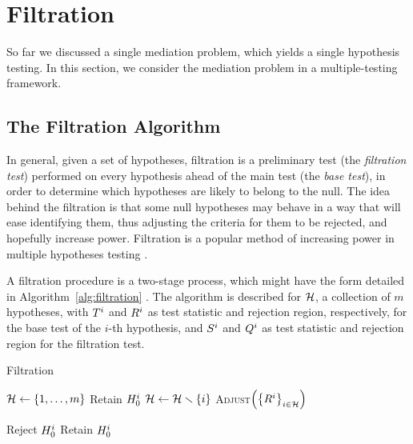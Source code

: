 \documentclass[ejs, twoside]{imsart}
\theoremstyle{plain}
\theoremstyle{remark}
\numberwithin{equation}{section}
\numberwithin{table}{section}
\numberwithin{figure}{section}
\let\originalleft\left
\let\originalright\right
\renewcommand{\left}{\mathopen{}\mathclose\bgroup\originalleft}
\renewcommand{\right}{\aftergroup\egroup\originalright}
\begin{document}
\section{Filtration} \label{sec:filt}
So far we discussed a single mediation problem, which yields a single hypothesis testing. In this section, we consider the mediation problem in a multiple-testing framework.

\subsection{The Filtration Algorithm} \label{sec:filt-alg}

In general, given a set of hypotheses, filtration is a preliminary test (the \emph{filtration test}) performed on every hypothesis ahead of the main test (the \emph{base test}), in order to determine which hypotheses are likely to belong to the null. The idea behind the filtration is that some null hypotheses may behave in a way that will ease identifying them, thus adjusting the criteria for them to be rejected, and hopefully increase power. Filtration is a popular method of increasing power in multiple hypotheses testing \citep{mcclintick_effects_2006, talloen_ini-calls_2007, hackstadt_filtering_2009}.

A filtration procedure is a two-stage process, which might have the form detailed in Algorithm~\ref{alg:filtration} \citep{bourgon_independent_2010, ignatiadis_data-driven_2016}. The algorithm is described for \(\mathcal{H}\), a collection of \(m\) hypotheses, with \(\basestat[i]\) and \(\baserr[i]\) as test statistic and rejection region, respectively, for the base test of the \(i\)-th hypothesis, and \(\filtstat[i]\) and  \(\filtrr[i]\) as test statistic and rejection region for the filtration test.

\begin{algorithm}
	\caption{Filtration} \label{alg:filtration}
	\begin{algorithmic}[0]
		\State \(\hypset \gets \left\lbrace 1, \dots, m \right\rbrace \)
		\If{\(\filevent[i]\)}
		\State Retain \(\hypname{0}[i]\)
		\State \(\mathcal{H} \gets \mathcal{H} \smallsetminus \left\lbrace i \right\rbrace \)
		\EndIf
		\EndFor
		\State \textsc{Adjust}\(\left( \left\lbrace R^i \right\rbrace _{i \in \mathcal{H}}\right) \)
		
		\If{\(\baserejeventadj[i]\)}
		\State Reject \(\hypname{0}[i]\)
		\Else
		\State Retain \(\hypname{0}[i]\)
		\EndIf
		\EndFor
	\end{algorithmic}
\end{algorithm}
\end{document}
